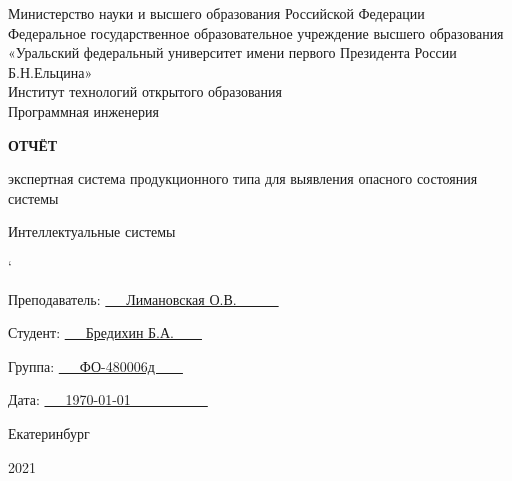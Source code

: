 \begin{titlepage}
    \begin{center}
        \small
        Министерство науки и высшего образования Российской Федерации\\
        Федеральное государственное образовательное учреждение высшего образования\\
        «Уральский федеральный университет имени первого Президента России Б.Н.Ельцина»\\
        Институт технологий открытого образования\\
        Программная инженерия
    \end{center}

    \vspace{3cm}
    
    \begin{center}
        {\Large \bfseries ОТЧЁТ}
        
        {\large экспертная система продукционного типа для выявления опасного состояния системы }

        Интеллектуальные системы
    \end{center}

`	\vspace{3em}

    
    \begin{flushright}
        \begin{minipage}[t]{0.5\columnwidth}%
            Преподаватель:
            \underline{~~~Лимановская О.В.~~~~~~}
            
            Студент:
            \underline{~~~Бредихин Б.А.~~~~}
            
            Группа: 
            \underline{~~~ФО-480006д~~~~}
            
            Дата: 
            \underline{~~~\today~~~~~~~~~~~}
        \end{minipage}
    \par\end{flushright}

    \vspace{\fill}
    
    \begin{center}
        Екатеринбург
        
        2021
    \end{center}

\end{titlepage}
